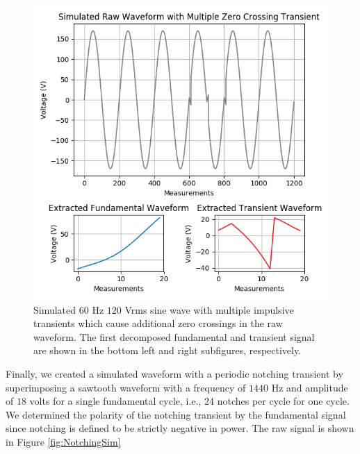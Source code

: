 \documentclass[10pt, conference, compsocconf]{IEEEtran}
\begin{document}
\begin{figure}[ht]
\centering%
\includegraphics[scale=0.35]{./figures/mult_z_crossing_sim.png}
\caption{Simulated $60$ Hz $120$ Vrms sine wave with multiple impulsive transients which cause additional zero crossings in the raw waveform. The first decomposed fundamental and transient signal are shown in the bottom left and right subfigures, respectively.}\label{fig:MultZSim}
\end{figure}

Finally, we created a simulated waveform with a periodic notching transient by superimposing a sawtooth waveform with a frequency of $1440$ Hz and amplitude of $18$ volts for a single fundamental cycle, i.e., 24 notches per cycle for one cycle. We determined the polarity of the notching transient by the fundamental signal since notching is defined to be strictly negative in power. The raw signal is shown in Figure \ref{fig:NotchingSim}
\end{document}
